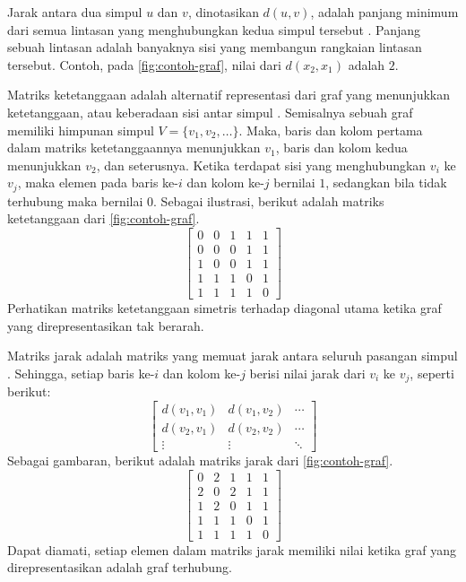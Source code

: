 Jarak antara dua simpul \(u\) dan \(v\), dinotasikan \(d(u, v)\), adalah panjang minimum dari semua lintasan yang menghubungkan kedua simpul tersebut \citep{chartrand2000}. Panjang sebuah lintasan adalah banyaknya sisi yang membangun rangkaian lintasan tersebut. Contoh, pada \autoref{fig:contoh-graf}, nilai dari \(d(x_2, x_1)\) adalah \(2\).

Matriks ketetanggaan adalah alternatif representasi dari graf yang menunjukkan ketetanggaan, atau keberadaan sisi antar simpul \citep{west1996}. Semisalnya sebuah graf memiliki himpunan simpul \(V = \{v_1, v_2, \ldots\}\). Maka, baris dan kolom pertama dalam matriks ketetanggaannya menunjukkan \(v_1\), baris dan kolom kedua menunjukkan \(v_2\), dan seterusnya. Ketika terdapat sisi yang menghubungkan \(v_i\) ke \(v_j\), maka elemen pada baris ke-\(i\) dan kolom ke-\(j\) bernilai \(1\), sedangkan bila tidak terhubung maka bernilai \(0\). Sebagai ilustrasi, berikut adalah matriks ketetanggaan dari \autoref{fig:contoh-graf}.
\[
\left[
\begin{array}{ccccc}
	0 & 0 & 1 & 1 & 1 \\
	0 & 0 & 0 & 1 & 1 \\
	1 & 0 & 0 & 1 & 1 \\
	1 & 1 & 1 & 0 & 1 \\
	1 & 1 & 1 & 1 & 0
\end{array}
\right]
\]
Perhatikan matriks ketetanggaan simetris terhadap diagonal utama ketika graf yang direpresentasikan tak berarah.

Matriks jarak adalah matriks yang memuat jarak antara seluruh pasangan simpul \citep{chartrand2000}. Sehingga, setiap baris ke-\(i\) dan kolom ke-\(j\) berisi nilai jarak dari \(v_i\) ke \(v_j\), seperti berikut:
\[
\left[
\begin{array}{ccc}
	d(v_1, v_1) & d(v_1, v_2) & \cdots \\
	d(v_2, v_1) & d(v_2, v_2) & \cdots \\
	\vdots & \vdots & \ddots
\end{array}
\right]
\]
Sebagai gambaran, berikut adalah matriks jarak dari \autoref{fig:contoh-graf}.
\[
\left[
\begin{array}{ccccc}
	0 & 2 & 1 & 1 & 1 \\
	2 & 0 & 2 & 1 & 1 \\
	1 & 2 & 0 & 1 & 1 \\
	1 & 1 & 1 & 0 & 1 \\
	1 & 1 & 1 & 1 & 0
\end{array}
\right]
\]
Dapat diamati, setiap elemen dalam matriks jarak memiliki nilai ketika graf yang direpresentasikan adalah graf terhubung.

